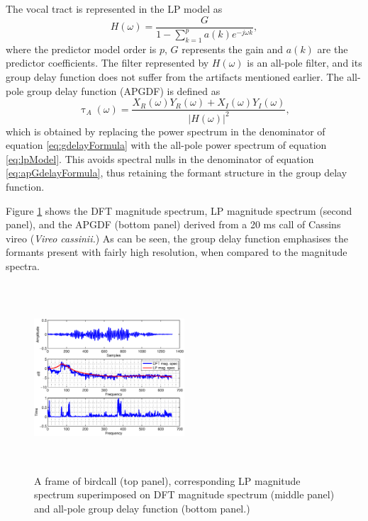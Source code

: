 \documentclass[a4paper]{article}
\begin{document}
The vocal tract is represented in the LP model as
\begin{equation}
H(\omega) = \frac{G}{1-\sum_{k=1}^{p} a(k) e^{-j \omega k}},
\label{eq:lpModel}
\end{equation}
where the predictor model order is $p$, $G$ represents the gain and $a(k)$ are
the predictor coefficients\cite{makhoul}.
The filter represented by $H(\omega)$ is an all-pole filter, and its group delay
function does not suffer from the artifacts mentioned earlier. The all-pole 
group delay function (APGDF) is defined as
\begin{equation}
\uptau_A(\omega) = \frac{X_R(\omega) Y_R(\omega) + X_I(\omega)
Y_I(\omega)}{|H(\omega)|^2},
\label{eq:apGdelayFormula}
\end{equation}
which is obtained by replacing the power spectrum in the denominator of equation
\ref{eq:gdelayFormula} with the all-pole power spectrum of equation
\ref{eq:lpModel}. This avoids spectral nulls in the denominator of equation
\ref{eq:apGdelayFormula}, thus retaining the formant structure in the group
delay function.

Figure \ref{fig:all-pole} shows the DFT magnitude spectrum, LP magnitude
spectrum (second panel), and the APGDF (bottom panel) derived from a 20 ms call 
of Cassins vireo (\textit{Vireo cassinii.}) As can be seen, the group delay
function emphasises the formants present with fairly high resolution, when
compared to the magnitude spectra.

\begin{figure}[h]
\includegraphics[width=0.5\textwidth,height=7cm]
{apgd.eps}
\caption{ A frame of birdcall (top panel), corresponding LP
magnitude spectrum superimposed on DFT magnitude spectrum (middle panel) and
all-pole group delay function (bottom panel.)  }
\label{fig:all-pole}
\end{figure}
\end{document}
